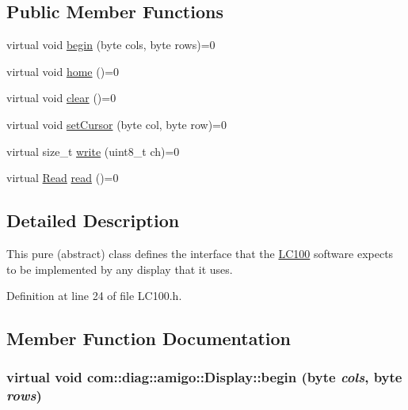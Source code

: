 \subsection*{Public Member Functions}
\begin{DoxyCompactItemize}
\item 
virtual void \hyperlink{structcom_1_1diag_1_1amigo_1_1Display_aaa68462ae2314243a31fd7532d51c911}{begin} (byte cols, byte rows)=0
\item 
\hypertarget{structcom_1_1diag_1_1amigo_1_1Display_a8aab5bf6b0cc0183d3b592240c42e6f3}{
virtual void \hyperlink{structcom_1_1diag_1_1amigo_1_1Display_a8aab5bf6b0cc0183d3b592240c42e6f3}{home} ()=0}
\label{structcom_1_1diag_1_1amigo_1_1Display_a8aab5bf6b0cc0183d3b592240c42e6f3}

\item 
\hypertarget{structcom_1_1diag_1_1amigo_1_1Display_abe7e1d0bee831b27c20baa105e7c3b4a}{
virtual void \hyperlink{structcom_1_1diag_1_1amigo_1_1Display_abe7e1d0bee831b27c20baa105e7c3b4a}{clear} ()=0}
\label{structcom_1_1diag_1_1amigo_1_1Display_abe7e1d0bee831b27c20baa105e7c3b4a}

\item 
virtual void \hyperlink{structcom_1_1diag_1_1amigo_1_1Display_ab5356a375bc24de2be5ce1b05bd9fd56}{setCursor} (byte col, byte row)=0
\item 
virtual size\_\-t \hyperlink{structcom_1_1diag_1_1amigo_1_1Display_a4fa3864436e551a42135fbbd3bcb1a3f}{write} (uint8\_\-t ch)=0
\item 
virtual \hyperlink{structcom_1_1diag_1_1amigo_1_1Display_a57e9915682f8aeb77066171c97c58288}{Read} \hyperlink{structcom_1_1diag_1_1amigo_1_1Display_ac630c8e1bbb3ce3091e6db01e1c383e7}{read} ()=0
\end{DoxyCompactItemize}


\subsection{Detailed Description}
This pure (abstract) class defines the interface that the \hyperlink{classcom_1_1diag_1_1amigo_1_1LC100}{LC100} software expects to be implemented by any display that it uses. 

Definition at line 24 of file LC100.h.



\subsection{Member Function Documentation}
\hypertarget{structcom_1_1diag_1_1amigo_1_1Display_aaa68462ae2314243a31fd7532d51c911}{
\subsubsection[{begin}]{\setlength{\rightskip}{0pt plus 5cm}virtual void com::diag::amigo::Display::begin (byte {\em cols}, \/  byte {\em rows})}}
\label{structcom_1_1diag_1_1amigo_1_1Display_aaa68462ae2314243a31fd7532d51c911}


